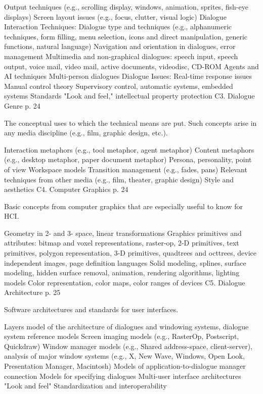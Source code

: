 Output techniques (e.g., scrolling display, windows, animation, sprites, fish-eye displays)
Screen layout issues (e.g., focus, clutter, visual logic)
Dialogue Interaction Techniques:
Dialogue type and techniques (e.g., alphanumeric techniques, form filling, menu selection, icons and direct manipulation, generic functions, natural language)
Navigation and orientation in dialogues, error management
Multimedia and non-graphical dialogues: speech input, speech output, voice mail, video mail, active documents, videodisc, CD-ROM
Agents and AI techniques
Multi-person dialogues
Dialogue Issues:
Real-time response issues
Manual control theory
Supervisory control, automatic systems, embedded systems
Standards
"Look and feel," intellectual property protection
C3. Dialogue Genre {p. 24}

The conceptual uses to which the technical means are put. Such concepts arise in any media discipline (e.g., film, graphic design, etc.).

Interaction metaphors (e.g., tool metaphor, agent metaphor)
Content metaphors (e.g., desktop metaphor, paper document metaphor)
Persona, personality, point of view
Workspace models
Transition management (e.g., fades, pans)
Relevant techniques from other media (e.g., film, theater, graphic design)
Style and aesthetics
C4. Computer Graphics {p. 24}

Basic concepts from computer graphics that are especially useful to know for HCI.

Geometry in 2- and 3- space, linear transformations
Graphics primitives and attributes: bitmap and voxel representations, raster-op, 2-D primitives, text primitives, polygon representation, 3-D primitives, quadtrees and octtrees, device independent images, page definition languages
Solid modeling, splines, surface modeling, hidden surface removal, animation, rendering algorithms, lighting models
Color representation, color maps, color ranges of devices
C5. Dialogue Architecture {p. 25}

Software architectures and standards for user interfaces.

Layers model of the architecture of dialogues and windowing systems, dialogue system reference models
Screen imaging models (e.g., RasterOp, Postscript, Quickdraw)
Window manager models (e.g., Shared address-space, client-server), analysis of major window systems (e.g., X, New Wave, Windows, Open Look, Presentation Manager, Macintosh)
Models of application-to-dialogue manager connection
Models for specifying dialogues
Multi-user interface architectures "Look and feel"
Standardization and interoperability
